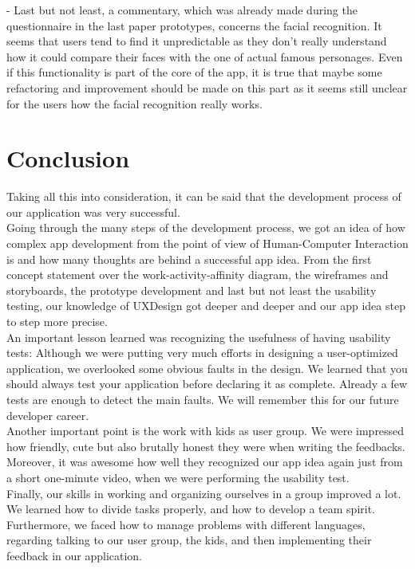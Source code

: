 \documentclass[12pt]{scrartcl}
\begin{document}
		- Last but not least, a commentary, which was already made during the questionnaire in the last paper prototypes, concerns the facial recognition. It seems that users tend to find it unpredictable as they don’t really understand how it could compare their faces with the one of actual famous personages. Even if this functionality is part of the core of the app, it is true that maybe some refactoring and improvement should be made on this part as it seems still unclear for the users how the facial recognition really works.

	
\section{Conclusion}

	
	Taking all this into consideration, it can be said that the development process of our application was very successful.\\

Going through the many steps of the development process, we got an idea of how complex app development from the point of view of Human-Computer Interaction is and how many thoughts are behind a successful app idea. From the first concept statement over the work-activity-affinity diagram, the wireframes and storyboards, the prototype development and last but not least the usability testing, our knowledge of UXDesign got deeper and deeper and our app idea step to step more precise.\\
An important lesson learned was recognizing the usefulness of having usability tests: Although we were putting very much efforts in designing a user-optimized application, we overlooked some obvious faults in the design. We learned that you should always test your application before declaring it as complete. Already a few tests are enough to detect the main faults. We will remember this for our future developer career.\\
Another important point is the work with kids as user group. We were impressed how friendly, cute but also brutally honest they were when writing the feedbacks. Moreover, it was awesome how well they recognized our app idea again just from a short one-minute video, when we were performing the usability test.\\
Finally, our skills in working and organizing ourselves in a group improved a lot. We learned how to divide tasks properly, and how to develop a team spirit. Furthermore, we faced how to manage problems with different languages, regarding talking to our user group, the kids, and then implementing their feedback in our application.
	
	
\end{document}
